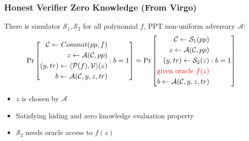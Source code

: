 \documentclass[UFT8]{beamer}
\begin{document}
\begin{frame}
    \frametitle{Honest Verifier Zero Knowledge (From Virgo)}
	There is simulator $\mathcal{S}_1, \mathcal{S}_2$ for all polynomial $f$, PPT non-uniform adversary $\mathcal{A}$:
	\begin{align*}
		\Pr\left[\begin{aligned}
			\mathcal{C} \leftarrow Commit(pp, f) \\
			z \leftarrow \mathcal{A}(\mathcal{C}, pp) \\
			(y, tr) \leftarrow \langle 
				\mathcal{P}(f), \mathcal{V}
			\rangle(z) \\
			b \leftarrow \mathcal{A}(\mathcal{C}, y, z, tr)
		\end{aligned}:
		b = 1
		\right] = 
		\Pr\left[\begin{aligned}
			\mathcal{C} \leftarrow \mathcal{S}_1(pp) \\
			z \leftarrow \mathcal{A}(\mathcal{C}, pp) \\
			(y, tr) \leftarrow \mathcal{S}_2(z) \\
			{\color{red}\text{given oracle } f(z)} \\
			b \leftarrow \mathcal{A}(\mathcal{C}, y, z, tr)
		\end{aligned}:
		b = 1
		\right]
	\end{align*}
	\begin{itemize}
		\item $z$ is chosen by $\mathcal{A}$
		\item Satisfying hiding and zero knowledge evaluation property
		\item $\mathcal{S}_2$ needs oracle access to $f(z)$
	\end{itemize}
\end{frame}
\end{document}
